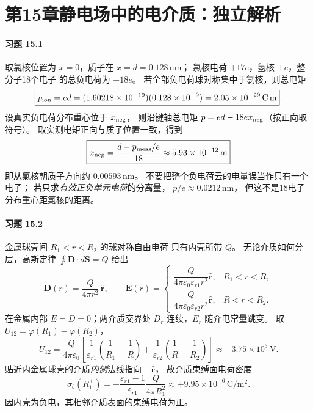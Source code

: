 \section*{第15章\quad 静电场中的电介质：独立解析}

\paragraph{习题 15.1}
取氯核位置为 \(x=0\)，质子在 \(x=d=0.128\,\mathrm{nm}\)；
氯核电荷 \(+17e\)，氢核 \(+e\)，整分子18个电子
的总负电荷为 \(-18e\)。
若全部负电荷球对称集中于氯核，则总电矩
\[
 \boxed{p_{\rm ion}=ed=(1.60218\times10^{-19})
 (0.128\times10^{-9})
 =2.05\times10^{-29}\,\mathrm{C\,m}}.
\]
设真实负电荷分布重心位于
\(x_{\rm neg}\)，
则沿键轴总电矩
\(p=ed-18ex_{\rm neg}\)（按正向取符号）。
取实测电矩正向与质子位置一致，得到
\[
 \boxed{x_{\rm neg}=
 \frac{d-p_{\rm meas}/e}{18}
 \approx5.93\times10^{-12}\,\mathrm m}
\]
即从氯核朝质子方向约 \(0.00593\,\mathrm{nm}\)。
不要把整个负电荷云的电量误当作只有一个电子；
若只求\emph{有效正负单元电荷}的分离量，
\(p/e\approx0.0212\,\mathrm{nm}\)，
但这不是18电子分布重心距氯核的距离。

\paragraph{习题 15.2}
金属球壳间 \(R_1<r<R_2\) 的球对称自由电荷
只有内壳所带 \(Q\)。
无论介质如何分层，高斯定律
\(\oint\boldsymbol D\cdot d\boldsymbol S=Q\) 给出
\[
 \boxed{\boldsymbol D(r)=
 \frac{Q}{4\pi r^2}\,\hat{\boldsymbol r}},\qquad
 \boxed{\boldsymbol E(r)=
 \begin{cases}
 \dfrac{Q}{4\pi\varepsilon_0\varepsilon_{r1}r^2}
 \hat{\boldsymbol r},&R_1<r<R,\\
 \dfrac{Q}{4\pi\varepsilon_0\varepsilon_{r2}r^2}
 \hat{\boldsymbol r},&R<r<R_2.
 \end{cases}}
\]
在金属内部 \(E=D=0\)；两介质交界处
\(D_r\) 连续，\(E_r\) 随介电常量跳变。
取 \(U_{12}=\varphi(R_1)-\varphi(R_2)\)，
\[
 \boxed{U_{12}=\frac{Q}{4\pi\varepsilon_0}
 \left[\frac1{\varepsilon_{r1}}
 \left(\frac1{R_1}-\frac1R\right)
 +\frac1{\varepsilon_{r2}}
 \left(\frac1R-\frac1{R_2}\right)\right]}
 \approx-3.75\times10^3\,\mathrm V.
\]
贴近内金属球壳的介质\emph{内侧}法线指向
\(-\hat{\boldsymbol r}\)，
故介质束缚面电荷密度
\[
 \boxed{\sigma_b(R_1^+)=
 -\frac{\varepsilon_{r1}-1}{\varepsilon_{r1}}
 \frac{Q}{4\pi R_1^2}
 \approx+9.95\times10^{-6}\,\mathrm{C/m^2}}.
\]
因内壳为负电，其相邻介质表面的束缚电荷为正。

